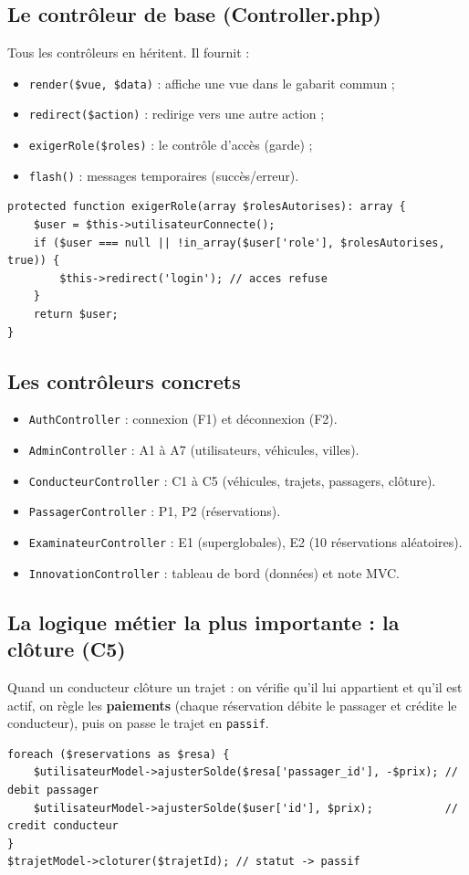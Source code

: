 \documentclass[11pt,a4paper]{article}
\begin{document}
\subsection{Le contrôleur de base (Controller.php)}
Tous les contrôleurs en héritent. Il fournit :
\begin{itemize}[noitemsep]
  \item \texttt{render(\$vue, \$data)} : affiche une vue dans le gabarit commun ;
  \item \texttt{redirect(\$action)} : redirige vers une autre action ;
  \item \texttt{exigerRole(\$roles)} : le contrôle d'accès (garde) ;
  \item \texttt{flash()} : messages temporaires (succès/erreur).
\end{itemize}
\begin{lstlisting}
protected function exigerRole(array $rolesAutorises): array {
    $user = $this->utilisateurConnecte();
    if ($user === null || !in_array($user['role'], $rolesAutorises, true)) {
        $this->redirect('login'); // acces refuse
    }
    return $user;
}
\end{lstlisting}

\subsection{Les contrôleurs concrets}
\begin{itemize}[noitemsep]
  \item \texttt{AuthController} : connexion (F1) et déconnexion (F2).
  \item \texttt{AdminController} : A1 à A7 (utilisateurs, véhicules, villes).
  \item \texttt{ConducteurController} : C1 à C5 (véhicules, trajets, passagers, clôture).
  \item \texttt{PassagerController} : P1, P2 (réservations).
  \item \texttt{ExaminateurController} : E1 (superglobales), E2 (10 réservations aléatoires).
  \item \texttt{InnovationController} : tableau de bord (données) et note MVC.
\end{itemize}

\subsection{La logique métier la plus importante : la clôture (C5)}
Quand un conducteur clôture un trajet : on vérifie qu'il lui appartient et qu'il
est actif, on règle les \textbf{paiements} (chaque réservation débite le passager
et crédite le conducteur), puis on passe le trajet en \texttt{passif}.
\begin{lstlisting}
foreach ($reservations as $resa) {
    $utilisateurModel->ajusterSolde($resa['passager_id'], -$prix); // debit passager
    $utilisateurModel->ajusterSolde($user['id'], $prix);           // credit conducteur
}
$trajetModel->cloturer($trajetId); // statut -> passif
\end{lstlisting}
\end{document}
